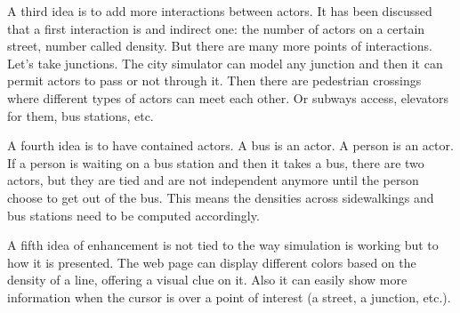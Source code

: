 \documentclass[conference]{IEEEtran}
\begin{document}
A third idea is to add more interactions between actors. It has been discussed that a first interaction is and indirect one: the number of actors on a certain street, number called density. But there are many more points of interactions. Let's take junctions. The city simulator can model any junction and then it can permit actors to pass or not through it. Then there are pedestrian crossings where different types of actors can meet each other. Or subways access, elevators for them, bus stations, etc.

A fourth idea is to have contained actors. A bus is an actor. A person is an actor. If a person is waiting on a bus station and then it takes a bus, there are two actors, but they are tied and are not independent anymore until the person choose to get out of the bus. This means the densities across sidewalkings and bus stations need to be computed accordingly.

A fifth idea of enhancement is not tied to the way simulation is working but to how it is presented. The web page can display different colors based on the density of a line, offering a visual clue on it. Also it can easily show more information when the cursor is over a point of interest (a street, a junction, etc.).


\vspace{12pt}
\end{document}
